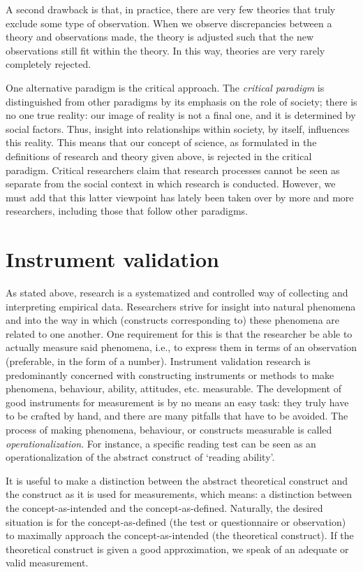 \documentclass[
]{book}
\begin{document}
A second drawback is that, in practice, there are very few theories that truly exclude some type of observation. When we observe discrepancies between a theory and observations made, the theory is adjusted such that the new observations still fit within the theory. In this way, theories are very rarely completely rejected.

One alternative paradigm is the critical approach. The \emph{critical paradigm} is distinguished from other paradigms by its emphasis on the role of society; there is no one true reality: our image of reality is not a final one, and it is determined by social factors. Thus, insight into relationships within society, by itself, influences this reality. This means that our concept of science, as formulated in the definitions of research and theory given above, is rejected in the critical paradigm. Critical researchers claim that research processes cannot be seen as separate from the social context in which research is conducted. However, we must add that this latter viewpoint has lately been taken over by more and more researchers, including those that follow other paradigms.

\hypertarget{sec:instrument-validation}{%
\section{Instrument validation}\label{sec:instrument-validation}}

As stated above, research is a systematized and controlled way of collecting and interpreting empirical data. Researchers strive for insight into natural phenomena and into the way in which (constructs corresponding to) these phenomena are related to one another. One requirement for this is that the researcher be able to actually measure said phenomena, i.e., to express them in terms of an observation (preferable, in the form of a number). Instrument validation research is predominantly concerned with constructing instruments or methods to make phenomena, behaviour, ability, attitudes, etc. measurable. The development of good instruments for measurement is by no means an easy task: they truly have to be crafted by hand, and there are many pitfalls that have to be avoided. The process of making phenomena, behaviour, or constructs measurable is called \emph{operationalization}. For instance, a specific reading test can be seen as an operationalization of the abstract construct of `reading ability'.

It is useful to make a distinction between the abstract theoretical construct and the construct as it is used for measurements, which means: a distinction between the concept-as-intended and the concept-as-defined. Naturally, the desired situation is for the concept-as-defined (the test or questionnaire or observation) to maximally approach the concept-as-intended (the theoretical construct). If the theoretical construct is given a good approximation, we speak of an adequate or valid measurement.
\end{document}
